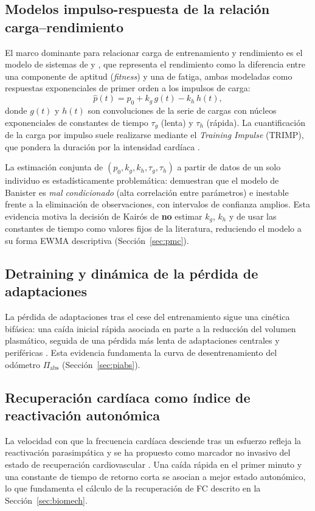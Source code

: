 \documentclass[11pt,a4paper]{article}
\begin{document}
\subsection{Modelos impulso-respuesta de la relación carga--rendimiento}
El marco dominante para relacionar carga de entrenamiento y rendimiento es el modelo de sistemas de \citet{banister1991} y \citet{calvert1976}, que representa el rendimiento como la diferencia entre una componente de aptitud (\emph{fitness}) y una de fatiga, ambas modeladas como respuestas exponenciales de primer orden a los impulsos de carga:
\begin{equation}
\hat{p}(t) = p_0 + k_g\, g(t) - k_h\, h(t),
\label{eq:banister_full}
\end{equation}
donde $g(t)$ y $h(t)$ son convoluciones de la serie de cargas con núcleos exponenciales de constantes de tiempo $\tau_g$ (lenta) y $\tau_h$ (rápida). La cuantificación de la carga por impulso suele realizarse mediante el \emph{Training Impulse} (TRIMP), que pondera la duración por la intensidad cardíaca \citep{banister1991,edwards1993}.

La estimación conjunta de $(p_0, k_g, k_h, \tau_g, \tau_h)$ a partir de datos de un solo individuo es estadísticamente problemática: \citet{hellard2006} demuestran que el modelo de Banister es \emph{mal condicionado} (alta correlación entre parámetros) e inestable frente a la eliminación de observaciones, con intervalos de confianza amplios. Esta evidencia motiva la decisión de Kairós de \textbf{no} estimar $k_g$, $k_h$ y de usar las constantes de tiempo como valores fijos de la literatura, reduciendo el modelo a su forma EWMA descriptiva (Sección~\ref{sec:pmc}).

\subsection{Detraining y dinámica de la pérdida de adaptaciones}
La pérdida de adaptaciones tras el cese del entrenamiento sigue una cinética bifásica: una caída inicial rápida asociada en parte a la reducción del volumen plasmático, seguida de una pérdida más lenta de adaptaciones centrales y periféricas \citep{coyle1984,mujika2000a,mujika2000b}. Esta evidencia fundamenta la curva de desentrenamiento del odómetro $\Pi_{\mathrm{abs}}$ (Sección~\ref{sec:piabs}).

\subsection{Recuperación cardíaca como índice de reactivación autonómica}
La velocidad con que la frecuencia cardíaca desciende tras un esfuerzo refleja la reactivación parasimpática y se ha propuesto como marcador no invasivo del estado de recuperación cardiovascular \citep{stanley2013}. Una caída rápida en el primer minuto y una constante de tiempo de retorno corta se asocian a mejor estado autonómico, lo que fundamenta el cálculo de la recuperación de FC descrito en la Sección~\ref{sec:biomech}.
\end{document}
